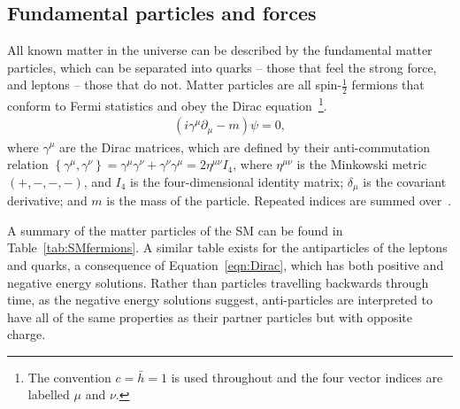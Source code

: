 \subsection{Fundamental particles and forces}
All known matter in the universe can be described by the fundamental matter particles, which can be separated into quarks -- those that feel the strong force, and leptons -- those that do not.
Matter particles are all spin-$\frac{1}{2}$ fermions that conform to Fermi statistics and obey the Dirac equation~\footnote{The convention $c=\bar{h}=1$ is used throughout and the four vector indices are labelled $\mu$ and $\nu$.}.
%
\begin{eqnarray}
\label{eqn:Dirac}
(i \gamma ^{\mu} \partial_{\mu} - m) \psi =0,
\end{eqnarray}
%
where $\gamma^{\mu}$ are the Dirac matrices, which are defined by their anti-commutation relation 
$\left\{ \gamma^{\mu}, \gamma^{\nu} \right\} = \gamma^{\mu} \gamma^{\nu} + \gamma^{\nu} \gamma^{\mu} = 2 \eta^{\mu\nu}I_{4}$,
where
$ \eta^{\mu\nu} $ is the Minkowski metric $(+, -, -, -)$, and $I_{4}$ is the four-dimensional identity matrix;
$\delta_{\mu}$ is the covariant derivative; and $m$ is the mass of the particle.
Repeated indices are summed over~\cite{HalzenMartin}.

A summary of the matter particles of the \ac{SM} can be found in Table~\ref{tab:SMfermions}. 
A similar table exists for the antiparticles of the leptons and quarks, a consequence of Equation~\ref{eqn:Dirac}, which has both positive and negative energy solutions. 
Rather than particles travelling backwards through time, as the negative energy solutions suggest, anti-particles are interpreted to have all of the same properties as their partner particles but with opposite charge.

